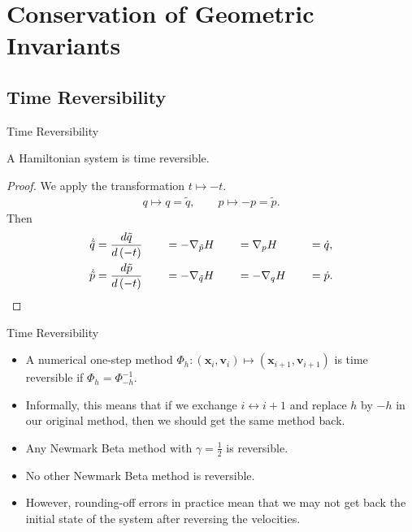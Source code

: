 \documentclass{beamer}
\renewcommand{\vec}[1]{\mathbf{#1}}
\begin{document}
\section{Conservation of Geometric Invariants}

\subsection{Time Reversibility}

\begin{frame}{Time Reversibility}
\begin{theorem} A Hamiltonian system is time reversible. \end{theorem}
\begin{proof}
	We apply the transformation $t \mapsto -t$.
	\begin{align*}
		q \mapsto q = \tilde{q},  \quad \quad p \mapsto -p = \tilde{p}.
	\end{align*}
	Then
	\begin{alignat*}{4}
		\dot{\tilde{q}} &= \frac{d\tilde{q}}{d\left(-t\right)} \quad &&= -\nabla_{\tilde{p}}H \quad &&= \nabla_{p}H \quad &&= \dot{q},\\
		\dot{\tilde{p}} &= \frac{d\tilde{p}}{d\left(-t\right)} \quad &&= -\nabla_{\tilde{q}}H \quad && =-\nabla_{q}H \quad &&= \dot{p}. \qedhere
	\end{alignat*}
\end{proof}
\end{frame}

\begin{frame}{Time Reversibility}
\begin{itemize}
	\item
	A numerical one-step method $\Phi_{h}: (\vec{x}_{i},\vec{v}_{i}) \mapsto (\vec{x}_{i+1},\vec{v}_{i+1})$ is time reversible if $\Phi_{h} = \Phi_{-h}^{-1}$.
	\item
	Informally, this means that if we exchange $i \leftrightarrow i+1$ and replace $h$ by $-h$ in our original method, then we should get the same method back.
	\item
	Any Newmark Beta method with $\gamma = \frac{1}{2}$  is reversible.
	\item	
	No other Newmark Beta method is reversible.
	\item
	However, rounding-off errors in practice mean that we may not get back the initial state of the system after reversing the velocities.
\end{itemize}
\end{frame}
\end{document}
